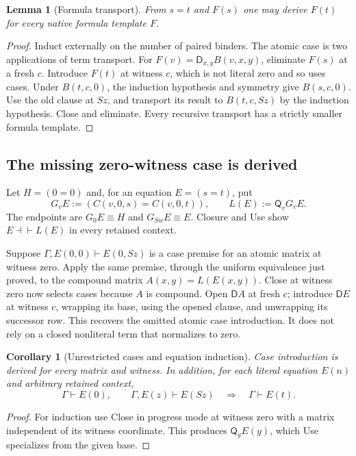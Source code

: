 \documentclass[11pt,letterpaper]{article}
\newtheorem{lemma}[theorem]{Lemma}
\newtheorem{corollary}[theorem]{Corollary}
\theoremstyle{definition}\newtheorem{definition}[theorem]{Definition}
\theoremstyle{remark}\newtheorem{remark}[theorem]{Remark}
\newcommand{\DD}{\mathsf D}
\newcommand{\QQ}{\mathsf Q}
\begin{document}
\begin{lemma}[Formula transport]\label{lem:formula-transport}
From $s=t$ and $F(s)$ one may derive $F(t)$ for every native formula
template $F$.
\end{lemma}
\begin{proof}
Induct externally on the number of paired binders. The atomic case
is two applications of term transport. For
$F(v)=\DD_{x,y}B(v,x,y)$, eliminate $F(s)$ at a fresh $c$.
Introduce $F(t)$ at witness $c$, which is not literal zero and so
uses cases. Under $B(t,c,0)$, the induction hypothesis and symmetry
give $B(s,c,0)$. Use the old clause at $Sz$, and transport its result
to $B(t,c,Sz)$ by the induction hypothesis. Close and eliminate.
Every recursive transport has a strictly smaller formula template.
\end{proof}

\subsection{The missing zero-witness case is derived}
Let $H=(0=0)$ and, for an equation $E=(s=t)$, put
\[
 G_vE:=(C(v,0,s)=C(v,0,t)),\qquad L(E):=\QQ_vG_vE.
\]
The endpoints are $G_0E\equiv H$ and $G_{Sw}E\equiv E$.
Closure and Use show $E\dashv\vdash L(E)$ in every retained context.

Suppose $\Gamma,E(0,0)\vdash E(0,Sz)$ is a case premise for an
atomic matrix at witness zero. Apply the same premise, through the
uniform equivalence just proved, to the compound matrix
$A(x,y)=L(E(x,y))$. Close at witness zero now selects cases because
$A$ is compound. Open $\DD A$ at fresh $c$; introduce $\DD E$ at
witness $c$, wrapping its base, using the opened clause, and unwrapping
its successor row. This recovers the omitted atomic case introduction.
It does not rely on a closed nonliteral term that normalizes to zero.

\begin{corollary}[Unrestricted cases and equation induction]\label{cor:induction}
Case introduction is derived for every matrix and witness. In addition,
for each literal equation $E(n)$ and arbitrary retained context,
\[
 \Gamma\vdash E(0),\qquad\Gamma,E(z)\vdash E(Sz)
 \quad\Longrightarrow\quad\Gamma\vdash E(t).
\]
\end{corollary}
\begin{proof}
For induction use Close in progress mode at witness zero with a
matrix independent of its witness coordinate. This produces
$\QQ_yE(y)$, which Use specializes from the given base.
\end{proof}
\end{document}
